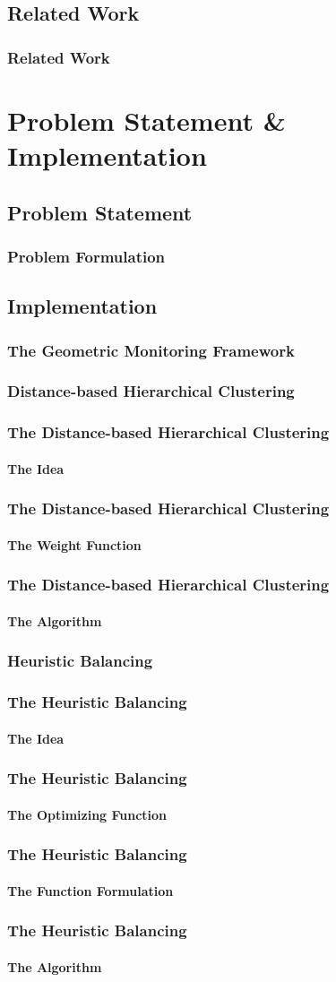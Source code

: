\documentclass[hyperref={pdfpagelabels=false}]{beamer}
\begin{document}
\subsection{Related Work}
\begin{frame} \frametitle{Related Work}

\end{frame}
\section{Problem Statement \& Implementation}
\subsection{Problem Statement}
\begin{frame} \frametitle{Problem Formulation}

\end{frame}
\subsection{Implementation}
\begin{frame} \frametitle{The Geometric Monitoring Framework}

\end{frame}
\subsubsection*{Distance-based Hierarchical Clustering}
\begin{frame} \frametitle{The Distance-based Hierarchical Clustering}\framesubtitle{The Idea}

\end{frame}
\begin{frame} \frametitle{The Distance-based Hierarchical Clustering}\framesubtitle{The Weight Function}

\end{frame}
\begin{frame} \frametitle{The Distance-based Hierarchical Clustering}\framesubtitle{The Algorithm}

\end{frame}
\subsubsection*{Heuristic Balancing}
\begin{frame} \frametitle{The Heuristic Balancing}\framesubtitle{The Idea}

\end{frame}
\begin{frame} \frametitle{The Heuristic Balancing}\framesubtitle{The Optimizing Function}

\end{frame}
\begin{frame} \frametitle{The Heuristic Balancing}\framesubtitle{The Function Formulation}

\end{frame}
\begin{frame} \frametitle{The Heuristic Balancing}\framesubtitle{The Algorithm}

\end{frame}
\end{document}
